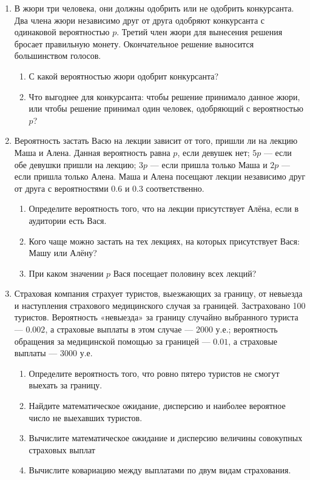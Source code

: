 \begin{enumerate}

\item В жюри три человека, они должны одобрить или не одобрить конкурсанта.
Два члена жюри независимо друг от друга одобряют конкурсанта с одинаковой
вероятностью $p$. Третий член жюри  для вынесения решения бросает правильную монету.
Окончательное решение выносится большинством голосов.
\begin{enumerate}
\item С какой вероятностью жюри одобрит конкурсанта?
\item Что выгоднее для  конкурсанта: чтобы решение принимало данное жюри, или
чтобы решение принимал один человек, одобряющий с вероятностью $p$?
\end{enumerate}

\item Вероятность застать Васю на лекции зависит от того, пришли ли на лекцию
Маша и Алена. Данная вероятность равна $p$, если девушек нет; $5p$ — если обе
девушки пришли на лекцию; $3p$ — если пришла только Маша и $2p$ — если пришла
только Алена. Маша и Алена посещают лекции независимо друг от друга с вероятностями
$0.6$ и $0.3$ соответственно.
\begin{enumerate}
\item Определите вероятность того, что на лекции присутствует Алёна,
если в аудитории есть Вася.
\item Кого чаще можно застать на тех лекциях, на которых присутствует Вася:
Машу или Алёну?
\item При каком значении $p$ Вася посещает половину всех лекций?
\end{enumerate}

\item Страховая компания страхует туристов, выезжающих за границу, от невыезда
и наступления страхового медицинского случая за границей. Застраховано 100 туристов.
Вероятность «невыезда» за границу случайно выбранного туриста — $0.002$,
а страховые выплаты в этом случае — 2000 у.е.; вероятность обращения за медицинской
помощью за границей — $0.01$, а страховые выплаты — 3000 у.е.
\begin{enumerate}
\item Определите вероятность того, что ровно пятеро туристов не смогут выехать за границу.
\item Найдите математическое ожидание, дисперсию и наиболее вероятное число не выехавших туристов.
\item Вычислите математическое ожидание и дисперсию величины совокупных страховых выплат
\item Вычислите ковариацию между выплатами по двум видам страхования.
\end{enumerate}


\end{enumerate}
